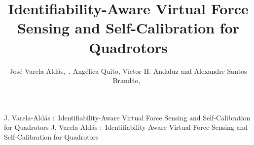 \documentclass{ieeeaccess}
\begin{document}

\title{Identifiability-Aware Virtual Force Sensing and Self-Calibration for Quadrotors}

\author{{Jos\'e Varela-Ald\'as},~, {Ang\'elica Quito}, {Víctor H. Andaluz}  and {Alexandre Santos Brandão},~}

\address[1]{Centro de Investigaci\'on MIST, Facultad de Ingenier\'ias,
Universidad Tecnol\'ogica Indoam\'erica, \mbox{Ambato 180103}, Ecuador
(e-mail: josevarela@uti.edu.ec)}

\address[2]{Faculty of Digital Engineering and Emerging Technologies,
International University of Ecuador UIDE, Quito 170411, Ecuador
(e-mail: anquitoca@uide.edu.ec)}

\address[3]{Departamento de Eléctrica, Electrónica y Telecomunicaciones, Universidad de las Fuerzas Armadas ESPE, Sangolquí 171103, Ecuador (e-mail: vhandaluz1@espe.edu.ec)}

\address[4]{Núcleo de Especialização em Robótica, Programa de Pós-Graduação em Ciência da Computação, Departamento de Engenharia Elétrica, Universidade Federal de Viçosa, Viçosa 36570-900, MG, Brazil (e-mail: alexandre.brandao@ufv.br)}


\markboth
{J. Varela-Ald\'as \headeretal:~Identifiability-Aware Virtual Force Sensing and Self-Calibration for Quadrotors}
{J. Varela-Ald\'as \headeretal:~Identifiability-Aware Virtual Force Sensing and Self-Calibration for Quadrotors}

\end{document}
